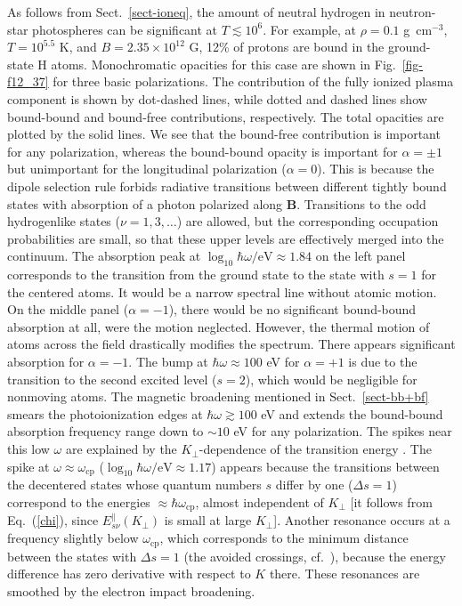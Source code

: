 \documentclass{emulateapj}
\newcommand{\gcc}{\mbox{g cm$^{-3}$}}
\newcommand{\req}[1]{Eq.\ (\ref{#1})}
\newcommand{\omp}{\omega_\mathrm{cp}}
\begin{document}
As follows from Sect.\ \ref{sect-ioneq}, the amount
of neutral hydrogen in neutron-star photospheres can be 
significant at $T\lesssim10^6$. For example,
at $\rho=0.1$ \gcc, $T=10^{5.5}$ K, and $B=2.35\times10^{12}$ G,
12\% of protons are bound in the ground-state H atoms.
Monochromatic opacities for this case are shown 
in Fig.\ \ref{fig-f12_37} for three basic polarizations.
The contribution of the fully ionized plasma component
is shown by dot-dashed lines, while dotted and dashed lines 
show bound-bound and bound-free contributions, respectively.
The total opacities are plotted by the solid lines.
We see that the bound-free contribution is important
for any polarization, whereas the bound-bound opacity is 
important for $\alpha=\pm1$ but unimportant for
the longitudinal polarization ($\alpha=0$).
This is because the dipole selection rule forbids
radiative transitions between different tightly bound 
states with absorption of a photon polarized along $\bm{B}$.
Transitions to the odd hydrogenlike states ($\nu=1,3,\ldots$) are
allowed, but the corresponding occupation probabilities are small,
so that these upper levels are effectively merged into the continuum.
The absorption peak at $\log_{10}\hbar\omega/\mbox{eV}\approx 1.84$
on the left panel
corresponds to the transition from the ground state
to the state with $s=1$ for the centered atoms.
It would be a narrow spectral line without atomic motion.
On the middle panel ($\alpha=-1$), 
there would be no significant bound-bound absorption 
at all, were the motion neglected.
However, the thermal motion of atoms across the field drastically
modifies the spectrum. There appears significant absorption 
for $\alpha=-1$. The bump at $\hbar\omega\approx 100$ eV 
for $\alpha=+1$ is due to 
 the transition to the second excited level ($s=2$), 
 which would be negligible for nonmoving atoms.
The magnetic broadening mentioned in Sect.\ \ref{sect-bb+bf}
smears the photoionization edges at $\hbar\omega\gtrsim100$ eV and
extends the bound-bound absorption frequency range 
down to $\sim10$ eV for
any polarization.
The spikes near this low $\omega$ are explained by the 
 $K_\perp$-dependence of the transition energy
\citep{PP95}.
 The spike at $\omega\approx\omp$ 
 ($\log_{10}\hbar\omega/\mbox{eV}\approx 1.17$)
 appears because
 the transitions between the
 decentered states whose quantum numbers $s$ differ by one
 ($\Delta s=1$) correspond to the energies 
 $\approx\hbar\omp$, almost independent of $K_\perp$
 [it follows from \req{chi}, since $E_{s\nu}^\|(K_\perp)$
 is small at large $K_\perp$].
 Another resonance occurs at a frequency
 slightly below $\omp$, which corresponds to the minimum 
 distance between the states with $\Delta s=1$ (the avoided
 crossings, cf.\ \citealp{P94}), because 
 the energy difference has zero derivative with respect to $K$ there.
 These resonances are smoothed by the electron impact
 broadening.
 
\end{document}
